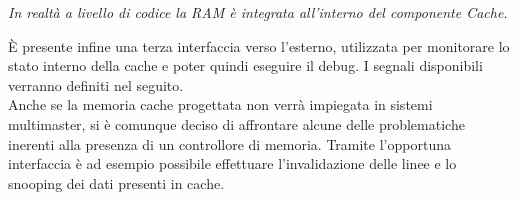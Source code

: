 \emph{In realt\`a a livello di codice la RAM \`e integrata all'interno del componente Cache.}


\`E presente infine una terza interfaccia verso l'esterno, utilizzata per monitorare lo stato interno della cache e poter quindi eseguire il debug.
I segnali disponibili verranno definiti nel seguito.\\


Anche se la memoria cache progettata non verr\`a impiegata in sistemi multimaster, si \`e comunque deciso di affrontare alcune delle problematiche inerenti alla presenza di un controllore di memoria. Tramite l'opportuna interfaccia \`e ad esempio possibile effettuare l'invalidazione delle linee e lo snooping dei dati presenti in cache.










